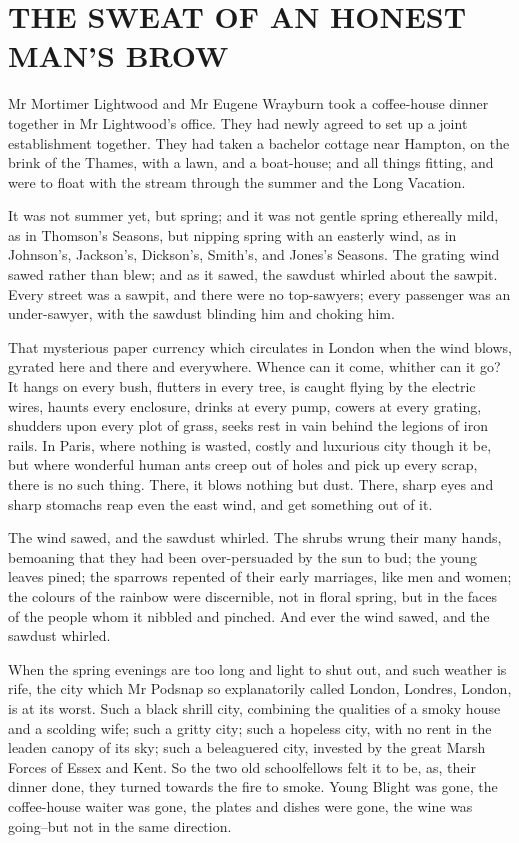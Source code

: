 
\chapter{THE SWEAT OF AN HONEST MAN’S BROW}

Mr Mortimer Lightwood and Mr Eugene Wrayburn took a coffee-house dinner
together in Mr Lightwood’s office. They had newly agreed to set up a
joint establishment together. They had taken a bachelor cottage near
Hampton, on the brink of the Thames, with a lawn, and a boat-house; and
all things fitting, and were to float with the stream through the summer
and the Long Vacation.

It was not summer yet, but spring; and it was not gentle spring
ethereally mild, as in Thomson’s Seasons, but nipping spring with an
easterly wind, as in Johnson’s, Jackson’s, Dickson’s, Smith’s, and
Jones’s Seasons. The grating wind sawed rather than blew; and as it
sawed, the sawdust whirled about the sawpit. Every street was a sawpit,
and there were no top-sawyers; every passenger was an under-sawyer, with
the sawdust blinding him and choking him.

That mysterious paper currency which circulates in London when the
wind blows, gyrated here and there and everywhere. Whence can it come,
whither can it go? It hangs on every bush, flutters in every tree, is
caught flying by the electric wires, haunts every enclosure, drinks at
every pump, cowers at every grating, shudders upon every plot of grass,
seeks rest in vain behind the legions of iron rails. In Paris, where
nothing is wasted, costly and luxurious city though it be, but where
wonderful human ants creep out of holes and pick up every scrap, there
is no such thing. There, it blows nothing but dust. There, sharp eyes
and sharp stomachs reap even the east wind, and get something out of it.

The wind sawed, and the sawdust whirled. The shrubs wrung their many
hands, bemoaning that they had been over-persuaded by the sun to bud;
the young leaves pined; the sparrows repented of their early marriages,
like men and women; the colours of the rainbow were discernible, not
in floral spring, but in the faces of the people whom it nibbled and
pinched. And ever the wind sawed, and the sawdust whirled.

When the spring evenings are too long and light to shut out, and such
weather is rife, the city which Mr Podsnap so explanatorily called
London, Londres, London, is at its worst. Such a black shrill city,
combining the qualities of a smoky house and a scolding wife; such a
gritty city; such a hopeless city, with no rent in the leaden canopy of
its sky; such a beleaguered city, invested by the great Marsh Forces of
Essex and Kent. So the two old schoolfellows felt it to be, as, their
dinner done, they turned towards the fire to smoke. Young Blight was
gone, the coffee-house waiter was gone, the plates and dishes were gone,
the wine was going--but not in the same direction.

